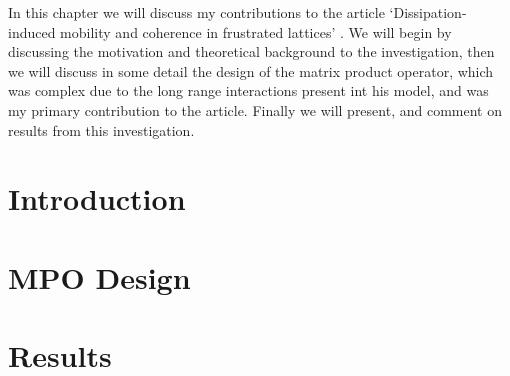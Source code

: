 In this chapter we will discuss my contributions to the article `Dissipation-induced mobility and coherence in frustrated lattices' \cite{OBH17}. We will begin by discussing the motivation and theoretical background to the investigation, then we will discuss in some detail the design of the matrix product operator, which was complex due to the long range interactions present int his model, and was my primary contribution to the article. Finally we will present, and comment on results from this investigation.

\section{Introduction}

\section{MPO Design}

\section{Results} 